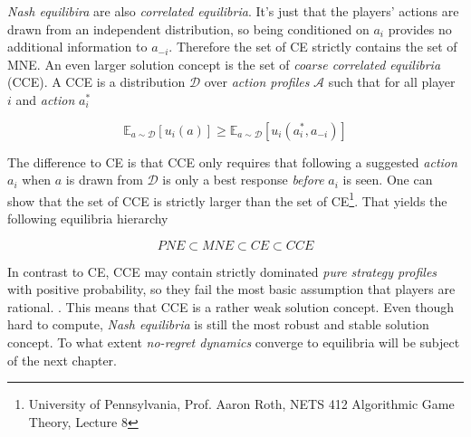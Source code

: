 \textit{Nash equilibira} are also \textit{correlated equilibria}. It's just that the players' actions are drawn from an independent distribution, so being conditioned on $a_i$ provides no additional information to $a_{-i}$. Therefore the set of CE strictly contains the set of MNE. An even larger solution concept is the set of \textit{coarse correlated equilibria} (CCE). A CCE is a distribution $\mathcal{D}$ over \textit{action profiles} $\mathcal{A}$ such that for all player $i$ and \textit{action} $a_{i}^{*}$

\begin{equation*}
    \mathbb{E}_{a \sim \mathcal{D}}[u_i(a)] \ge \mathbb{E}_{a \sim \mathcal{D}}[u_i(a_{i}^{*},a_{-i})]
\end{equation*}

The difference to CE is that CCE only requires that following a suggested \textit{action} $a_i$ when $a$ is drawn from $\mathcal{D}$ is only a best response \textit{before} $a_i$ is seen. One can show that the set of CCE is strictly larger than the set of CE\footnote{University of Pennsylvania, Prof. Aaron Roth, NETS 412 Algorithmic Game Theory, Lecture 8}. That yields the following equilibria hierarchy

\begin{equation*}
    PNE \subset MNE \subset CE \subset CCE
\end{equation*}

In contrast to CE, CCE may contain strictly dominated \textit{pure strategy profiles} with positive probability, so they fail the most basic assumption that players are rational. \cite{viossat}. This means that CCE is a rather weak solution concept. Even though hard to compute, \textit{Nash equilibria} is still the most robust and stable solution concept. To what extent \textit{no-regret dynamics} converge to equilibria will be subject of the next chapter. 


